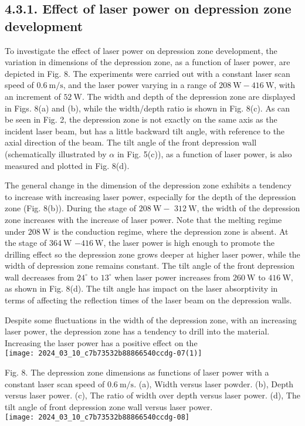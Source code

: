 \documentclass[10pt]{article}
\begin{document}
\subsection*{4.3.1. Effect of laser power on depression zone development}
To investigate the effect of laser power on depression zone development, the variation in dimensions of the depression zone, as a function of laser power, are depicted in Fig. 8. The experiments were carried out with a constant laser scan speed of $0.6 \mathrm{~m} / \mathrm{s}$, and the laser power varying in a range of $208 \mathrm{~W}-416 \mathrm{~W}$, with an increment of $52 \mathrm{~W}$. The width and depth of the depression zone are displayed in Figs. 8(a) and (b), while the width/depth ratio is shown in Fig. 8(c). As can be seen in Fig. 2, the depression zone is not exactly on the same axis as the incident laser beam, but has a little backward tilt angle, with reference to the axial direction of the beam. The tilt angle of the front depression wall (schematically illustrated by $\alpha$ in Fig. 5(c)), as a function of laser power, is also measured and plotted in Fig. 8(d).

The general change in the dimension of the depression zone exhibits a tendency to increase with increasing laser power, especially for the depth of the depression zone (Fig. 8(b)). During the stage of $208 \mathrm{~W}-$ $312 \mathrm{~W}$, the width of the depression zone increases with the increase of laser power. Note that the melting regime under $208 \mathrm{~W}$ is the conduction regime, where the depression zone is absent. At the stage of $364 \mathrm{~W}$ $-416 \mathrm{~W}$, the laser power is high enough to promote the drilling effect so the depression zone grows deeper at higher laser power, while the width of depression zone remains constant. The tilt angle of the front depression wall decreases from $24^{\circ}$ to $13^{\circ}$ when laser power increases from $260 \mathrm{~W}$ to $416 \mathrm{~W}$, as shown in Fig. 8(d). The tilt angle has impact on the laser absorptivity in terms of affecting the reflection times of the laser beam on the depression walls.

Despite some fluctuations in the width of the depression zone, with an increasing laser power, the depression zone has a tendency to drill into the material. Increasing the laser power has a positive effect on the\\
\texttt{[image: 2024\_03\_10\_c7b73532b88866540ccdg-07(1)]}

Fig. 8. The depression zone dimensions as functions of laser power with a constant laser scan speed of $0.6 \mathrm{~m} / \mathrm{s}$. (a), Width versus laser powder. (b), Depth versus laser power. (c), The ratio of width over depth versus laser power. (d), The tilt angle of front depression zone wall versus laser power.\\
\texttt{[image: 2024\_03\_10\_c7b73532b88866540ccdg-08]}
\end{document}

